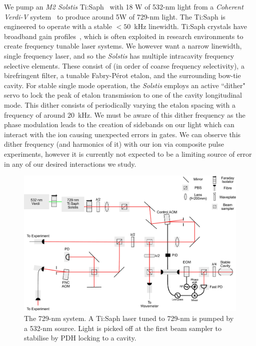     We pump an \emph{M2 Solstis} Ti:Saph~\cite{XXX} with 18 W of 532-nm light
    from a \emph{Coherent Verdi-V} system~\cite{XXX} to produce around 5W of
    729-nm light.  The Ti:Saph is engineered to operate with a stable $<50$~kHz
    linewidth. Ti:Saph crystals have broadband gain profiles~\cite{XXX}, which
    is often exploited in research environments to create frequency tunable
    laser systems. We however want a narrow linewidth, single frequency laser,
    and so the \emph{Solstis} has multiple intracavity frequency selective
    elements. These consist of (in order of coarse frequency selectivity), a
    birefringent filter, a tunable Fabry-P\'erot etalon, and the surrounding
    bow-tie cavity. For stable single mode operation, the \emph{Solstis} employs
    an active ``dither" servo to lock the peak of etalon transmission to one of
    the cavity longitudinal mode. This dither consists of periodically varying
    the etalon spacing with a frequency of around 20~kHz. We must be aware of
    this dither frequency as the phase modulation leads to the creation of
    sidebands on our light which can interact with the ion causing unexpected
    errors in gates. We can observe this dither frequency (and harmonics of it)
    with our ion via composite pulse experiments, however it is currently not
    expected to be a limiting source of error in any of our desired interactions
    we study.\\
    \begin{figure}
    \begin{center}
    \noindent\includegraphics[width=0.9\linewidth]{figures/pdf_figure/729_path_small.pdf}
    \end{center}
    \caption{The 729-nm system. A Ti:Saph laser tuned to 729-nm is
        pumped by a 532-nm source. Light is picked off at the first beam
        sampler to stabilise by PDH locking to a cavity.}
    \label{fig:729}
    \end{figure}
